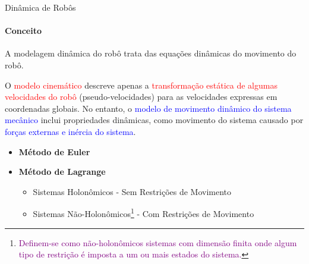 \documentclass[aspectratio=169]{beamer}
\begin{document}
\begin{frame}{Dinâmica de Robôs}
    \framesubtitle{Conceito}
    A modelagem dinâmica do robô trata das equações dinâmicas do movimento do robô.
    
    \begin{block}{}
        O \textcolor{red}{modelo cinemático} descreve apenas a \textcolor{red}{transformação estática de algumas velocidades do robô} (pseudo-velocidades) para as velocidades expressas em coordenadas globais. No entanto, o \textcolor{blue}{modelo de movimento dinâmico do sistema mecânico} inclui propriedades dinâmicas, como movimento do sistema causado por \textcolor{blue}{forças externas e inércia do sistema}.
    \end{block}

    \begin{itemize}
        \item \textbf{Método de Euler}
        \item \textbf{Método de Lagrange}
        \begin{itemize}
            \item Sistemas Holonômicos - Sem Restrições de Movimento
            \item Sistemas Não-Holonômicos\footnote[frame]{\textcolor{purple}{Definem-se como não-holonômicos sistemas com dimensão finita onde algum tipo de restrição é imposta a um ou mais estados do sistema.}} - Com Restrições de Movimento
        \end{itemize}
    \end{itemize}
\end{frame}
\end{document}

